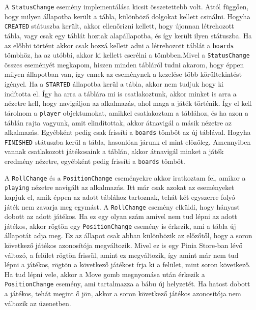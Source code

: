 \documentclass[a4paper,twoside]{article}
\begin{document}
A \verb|StatusChange| esemény implementálása kicsit összetettebb volt. Attól függően, hogy milyen állapotba került a tábla, különböző dolgokat kellett csinálni. Hogyha \verb|CREATED| státuszba került, akkor ellenőrizni kellett, hogy újonnan létrehozott tábla, vagy csak egy táblát hoztak alapállapotba, és így került ilyen státuszba. Ha az előbbi történt akkor csak hozzá kellett adni a létrehozott táblát a \verb|boards| tömbhöz, ha az utóbbi, akkor ki kellett cserélni a tömbben.Mivel a \verb|StatusChange| összes eseményét megkapom, hiszen minden tábláról tudni akarom, hogy éppen milyen állapotban van, így ennek az eseménynek a kezelése több körültekintést igényel. Ha a \verb|STARTED| állapotba kerül a tábla, akkor nem tudjuk hogy ki indította el. Így ha arra a táblára mi is csatlakoztunk, akkor minket is arra a nézetre kell, hogy navigáljon az alkalmazás, ahol maga a játék történik. Így el kell tárolnom a \verb|player| objektumokat, amikkel csatlakoztam a táblához, és ha azon a táblán rajta vagyunk, amit elindítottak, akkor átnavigál a másik nézetre az alkalmazás. Egyébként pedig csak frissíti a \verb|boards| tömböt az új táblával. Hogyha \verb|FINISHED| státuszba kerül a tábla, hasonlóan járunk el mint előzőleg. Amennyiben vannak csatlakozott játékosaink a táblán, akkor átnavigál minket a játék eredmény nézetre, egyébként pedig frissíti a \verb|boards| tömböt. 

A \verb|RollChange| és a \verb|PositionChange| eseményekre akkor iratkoztam fel, amikor a \verb|playing| nézetre navigált az alkalmazás. Itt már csak azokat az eseményeket kapjuk el, amik éppen az adott táblához tartoznak, tehát két egyszerre folyó játék nem zavarja meg egymást. A \verb|RollChange| esemény elküldi, hogy hányast dobott az adott játékos. Ha ez egy olyan szám amivel nem tud lépni az adott játékos, akkor rögtön egy \verb|PositionChange| esemény is érkezik, ami a tábla új állapotát adja meg. Ez az állapot csak abban különbözik az előzőtől, hogy a soron következő játékos azonosítója megváltozik. Mivel ez is egy Pinia Store-ban lévő változó, a felület rögtön frissül, amint ez megváltozik, így amint már nem tud lépni a játékos, rögtön a következő játékost írja ki a felület, mint soron következő. Ha tud lépni vele, akkor a Move gomb megnyomása után érkezik a \verb|PositionChange| esemény, ami tartalmazza a bábu új helyzetét. Ha hatost dobott a játékos, tehát megint ő jön, akkor a soron következő játékos azonosítója nem változik az üzenetben.  
\end{document}
